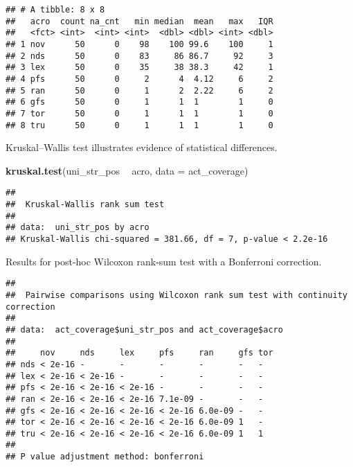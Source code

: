 \documentclass[]{book}
\newenvironment{Shaded}{\begin{snugshade}}{\end{snugshade}}
\newcommand{\DataTypeTok}[1]{\textcolor[rgb]{0.13,0.29,0.53}{#1}}
\newcommand{\KeywordTok}[1]{\textcolor[rgb]{0.13,0.29,0.53}{\textbf{#1}}}
\newcommand{\NormalTok}[1]{#1}
\newcommand{\OperatorTok}[1]{\textcolor[rgb]{0.81,0.36,0.00}{\textbf{#1}}}
\newcommand{\OtherTok}[1]{\textcolor[rgb]{0.56,0.35,0.01}{#1}}
\newcommand{\StringTok}[1]{\textcolor[rgb]{0.31,0.60,0.02}{#1}}
\begin{document}
\begin{verbatim}
## # A tibble: 8 x 8
##   acro  count na_cnt   min median  mean   max   IQR
##   <fct> <int>  <int> <int>  <dbl> <dbl> <int> <dbl>
## 1 nov      50      0    98    100 99.6    100     1
## 2 nds      50      0    83     86 86.7     92     3
## 3 lex      50      0    35     38 38.3     42     1
## 4 pfs      50      0     2      4  4.12     6     2
## 5 ran      50      0     1      2  2.22     6     2
## 6 gfs      50      0     1      1  1        1     0
## 7 tor      50      0     1      1  1        1     0
## 8 tru      50      0     1      1  1        1     0
\end{verbatim}

Kruskal--Wallis test illustrates evidence of statistical differences.

\begin{Shaded}
\begin{Highlighting}[]
\KeywordTok{kruskal.test}\NormalTok{(uni_str_pos }\OperatorTok{~}\StringTok{ }\NormalTok{acro, }\DataTypeTok{data =}\NormalTok{ act_coverage)}
\end{Highlighting}
\end{Shaded}

\begin{verbatim}
## 
##  Kruskal-Wallis rank sum test
## 
## data:  uni_str_pos by acro
## Kruskal-Wallis chi-squared = 381.66, df = 7, p-value < 2.2e-16
\end{verbatim}

Results for post-hoc Wilcoxon rank-sum test with a Bonferroni correction.

\begin{Shaded}
\end{Shaded}

\begin{verbatim}
## 
##  Pairwise comparisons using Wilcoxon rank sum test with continuity correction 
## 
## data:  act_coverage$uni_str_pos and act_coverage$acro 
## 
##     nov     nds     lex     pfs     ran     gfs tor
## nds < 2e-16 -       -       -       -       -   -  
## lex < 2e-16 < 2e-16 -       -       -       -   -  
## pfs < 2e-16 < 2e-16 < 2e-16 -       -       -   -  
## ran < 2e-16 < 2e-16 < 2e-16 7.1e-09 -       -   -  
## gfs < 2e-16 < 2e-16 < 2e-16 < 2e-16 6.0e-09 -   -  
## tor < 2e-16 < 2e-16 < 2e-16 < 2e-16 6.0e-09 1   -  
## tru < 2e-16 < 2e-16 < 2e-16 < 2e-16 6.0e-09 1   1  
## 
## P value adjustment method: bonferroni
\end{verbatim}
\end{document}
